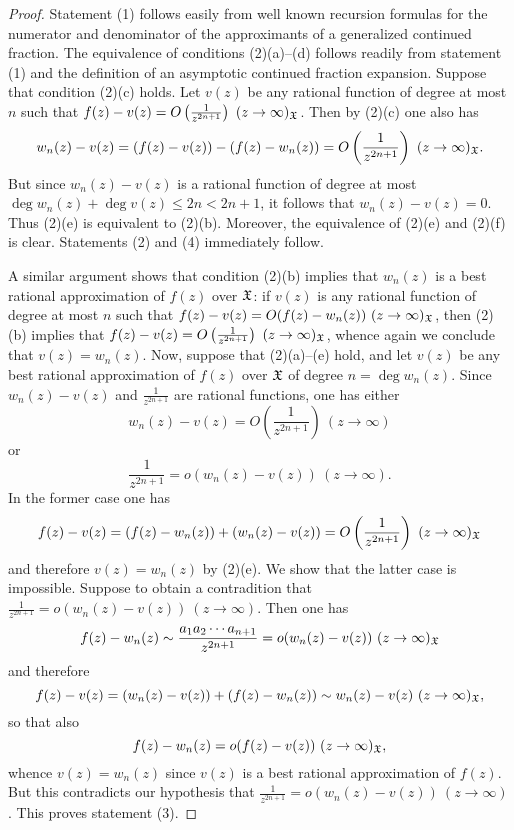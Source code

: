 \documentclass[12pt]{article}
\begin{document}
\begin{proof} 
Statement (1) follows easily from well known recursion formulas for the numerator and denominator of the approximants of a generalized continued fraction.  The equivalence of conditions (2)(a)--(d) follows readily from statement (1) and the definition of an asymptotic continued fraction expansion.   Suppose that condition (2)(c) holds.  Let $v(z)$ be any rational function of degree at most $n$ such that $f(z) - v(z) = O\left(\frac{1}{z^{2n+1}} \right) \ (z \to \infty)_\XX$.  Then by (2)(c) one also has $$w_n(z) - v(z) = (f(z)-v(z)) - (f(z)-w_n(z)) =  O\left(\frac{1}{z^{2n+1}} \right) \ (z \to \infty)_{\mathfrak X}.$$  But since $w_n(z)- v(z)$ is a rational function of degree at most $\deg w_n(z)+ \deg v(z) \leq 2n < 2n+1$, it follows that $w_n(z) - v(z) = 0$.  Thus (2)(e) is equivalent to (2)(b).  Moreover,  the equivalence of (2)(e) and (2)(f) is clear.  Statements (2) and (4) immediately follow.  

A similar argument shows that condition (2)(b)  implies that $w_n(z)$ is a best rational approximation of $f(z)$ over ${\mathfrak X}$:  if $v(z)$ is any rational function of degree at most $n$ such that $f(z) - v(z) = O(f(z)-w_n(z)) \ (z \to \infty)_{\mathfrak X}$, then (2)(b) implies that $f(z) - v(z) =  O\left(\frac{1}{z^{2n+1}} \right) \ (z \to \infty)_\XX$, whence again we conclude that $v(z) = w_n(z)$.  Now, suppose that (2)(a)--(e) hold, and let $v(z)$ be any best rational approximation of $f(z)$ over ${\mathfrak X}$ of degree $n = \deg w_n(z)$.  Since $ w_n(z)-v(z)$  and $\frac{1}{z^{2n+1}}$ are rational functions, one has either 
$$w_n(z)-v(z) =  O\left(\frac{1}{z^{2n+1}} \right)  \ (z \to \infty)$$
or
$$\frac{1}{z^{2n+1}} =  o(w_n(z)-v(z))  \ (z \to \infty).$$
In the former case one has
$$f(z)-v(z) = (f(z)-w_n(z))+ (w_n(z)-v(z)) =  O\left(\frac{1}{z^{2n+1}} \right) \ (z \to \infty)_{\mathfrak X}$$  
and therefore $v(z) = w_n(z)$ by (2)(e).   We show that the latter case is impossible.  Suppose to obtain a contradition that $\frac{1}{z^{2n+1}} =  o(w_n(z)-v(z))  \ (z \to \infty).$  Then one has
$$f(z)-w_n(z) \sim \frac{a_1 a_2 \cdots a_{n+1}}{z^{2n+1}} =  o(w_n(z)-v(z)) \ (z \to \infty)_{\mathfrak X}$$
and therefore
$$f(z)-v(z)  = (w_n(z)-v(z)) + (f(z)-w_n(z)) \sim w_n(z)-v(z) \ (z \to \infty)_{\mathfrak X},$$
so that also
$$f(z)-w_n(z) =  o(f(z)-v(z)) \ (z \to \infty)_{\mathfrak X},$$
whence $v(z) = w_n(z)$ since $v(z)$ is a best rational approximation of $f(z)$.   But this contradicts our hypothesis that $\frac{1}{z^{2n+1}} =  o(w_n(z) - v(z))  \ (z \to \infty)$.  This proves statement (3).  
\end{proof}
\end{document}
